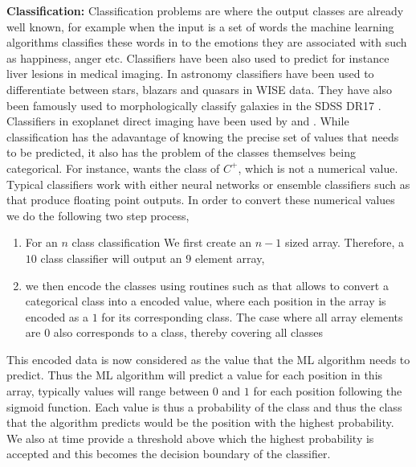 \textbf{Classification:}
Classification problems are where the output classes are already well known, for example when the input is a set of words the machine learning algorithms classifies these words in to the emotions they are associated with such as happiness, anger etc. 
Classifiers have been also used to predict for instance liver lesions \cite{2023Nanda} in medical imaging. 
In astronomy classifiers have been used to differentiate between stars, blazars and quasars \cite{2023Zhao} in WISE data.
They have also been famously used to morphologically classify galaxies in the SDSS DR17 \cite{2019MNRASFischer}.
Classifiers in exoplanet direct imaging have been used by \citep[SODINN, ][]{2018Gomez} and \citep[NA-SODINN][]{2023Carlito}.
While classification has the adavantage of knowing the precise set of values that needs to be predicted, it also has the problem of the classes themselves being categorical.
For instance, \citep[SODINN, ][]{2018Gomez} wants the class of $C^{+}$, which is not a numerical value.
Typical classifiers work with either neural networks or ensemble classifiers such as \citep[Random Forests, ][]{breiman2001random} that produce floating point outputs.
In order to convert these numerical values we do the following two step process,
\begin{enumerate}
    \item For an $n$ class classification We first create an $n-1$ sized array.
    Therefore, a $10$ class classifier will output an $9$ element array, 
    \item we then encode the classes using routines such as \citep[One hot encoding][]{harris2010digital} that allows to convert a categorical class into a encoded value, where each position in the array is encoded as a $1$ for its corresponding class.
    The case where all array elements are $0$ also corresponds to a class, thereby covering all classes
\end{enumerate}
This encoded data is now considered as the value that the ML algorithm needs to predict.
Thus the ML algorithm will predict a value for each position in this array, typically values will range between $0$ and $1$ for each position following the sigmoid function.
Each value is thus a probability of the class and thus the class that the algorithm predicts would be the position with the highest probability.
We also at time provide a threshold above which the highest probability is accepted and this becomes the decision boundary of the classifier.

